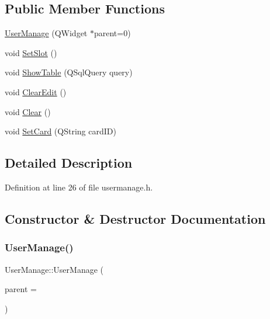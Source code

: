 \subsection*{Public Member Functions}
\begin{DoxyCompactItemize}
\item 
\mbox{\hyperlink{class_user_manage_ae341d2b1a3a87f0603a2788f37517c4a}{User\+Manage}} (Q\+Widget $\ast$parent=0)
\item 
void \mbox{\hyperlink{class_user_manage_aa838d49f063bc0a081a1eb4d967c2da3}{Set\+Slot}} ()
\item 
void \mbox{\hyperlink{class_user_manage_aa0a2437c0e95fb846c0e5a237d848af2}{Show\+Table}} (Q\+Sql\+Query query)
\item 
void \mbox{\hyperlink{class_user_manage_afe9919891a0c86cb075ddb9bc12b2be6}{Clear\+Edit}} ()
\item 
void \mbox{\hyperlink{class_user_manage_af3849a855fdde995372d3162fb358472}{Clear}} ()
\item 
void \mbox{\hyperlink{class_user_manage_ab4b39d4a967fc173c0a5ae5d3e2f2ef8}{Set\+Card}} (Q\+String card\+ID)
\end{DoxyCompactItemize}


\subsection{Detailed Description}


Definition at line 26 of file usermanage.\+h.



\subsection{Constructor \& Destructor Documentation}
\mbox{\label{class_user_manage_ae341d2b1a3a87f0603a2788f37517c4a}} 
\subsubsection{\texorpdfstring{UserManage()}{UserManage()}}
{\footnotesize\ttfamily User\+Manage\+::\+User\+Manage (\begin{DoxyParamCaption}\item[{Q\+Widget $\ast$}]{parent = {} }\end{DoxyParamCaption})\hspace{0.3cm}{\ttfamily [explicit]}}



